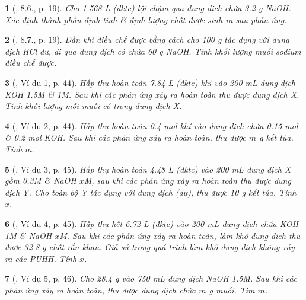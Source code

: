 \documentclass{article}
\newtheorem{baitoan}{}
\begin{document}
\begin{baitoan}[\cite{Truong_BTNC_Hoa_Hoc_9_2021}, 8.6., p. 19]
	Cho {\rm1.568 L } (đktc) lội chậm qua dung dịch chứa {\rm3.2 g NaOH}. Xác định thành phần định tính \& định lượng chất được sinh ra sau phản ứng.
\end{baitoan}

\begin{baitoan}[\cite{Truong_BTNC_Hoa_Hoc_9_2021}, 8.7., p. 19]
	Dẫn khí {\rm{}} điều chế được bằng cách cho {\rm100 g } tác dụng với dung dịch {\rm HCl} dư, đi qua dung dịch có chứa {\rm60 g NaOH}. Tính khối lượng muối sodium điều chế được.
\end{baitoan}

\begin{baitoan}[\cite{Truong_Long_Huong_bdhsg_Hoa_Hoc_9}, Ví dụ 1, p. 44]
	Hấp thụ hoàn toàn {\rm7.84 L} (đktc) khí {\rm{}} vào {\rm200 mL} dung dịch {\rm KOH 1.5M} \& {\rm{} 1M}. Sau khi các phản ứng xảy ra hoàn toàn thu được dung dịch X. Tính khối lượng mỗi muối có trong dung dịch X.
\end{baitoan}

\begin{baitoan}[\cite{Truong_Long_Huong_bdhsg_Hoa_Hoc_9}, Ví dụ 2, p. 44]
	Hấp thụ hoàn toàn {\rm0.4 mol} khí {\rm{}} vào dung dịch chứa {\rm0.15 mol } \& {\rm0.2 mol KOH}. Sau khi các phản ứng xảy ra hoàn toàn, thu được $m$ {\rm g} kết tủa. Tính $m$.
\end{baitoan}

\begin{baitoan}[\cite{Truong_Long_Huong_bdhsg_Hoa_Hoc_9}, Ví dụ 3, p. 45]
	Hấp thụ hoàn toàn {\rm4.48 L } (đktc) vào {\rm200 mL} dung dịch X gồm {\rm{} 0.3M \& NaOH $x$M}, sau khi các phản ứng xảy ra hoàn toàn thu được dung dịch Y. Cho toàn bộ Y tác dụng với dung dịch {\rm{}} (dư), thu được {\rm10 g} kết tủa. Tính $x$.
\end{baitoan}

\begin{baitoan}[\cite{Truong_Long_Huong_bdhsg_Hoa_Hoc_9}, Ví dụ 4, p. 45]
	Hấp thụ hết {\rm6.72 L } (đktc) vào {\rm200 mL} dung dịch chứa {\rm KOH 1M} \& {\rm NaOH $x$M}. Sau khi các phản ứng xảy ra hoàn toàn, làm khô dung dịch thu được {\rm32.8 g} chất rắn khan. Giả sử trong quá trình làm khô dung dịch không xảy ra các {\rm PƯHH}. Tính $x$.
\end{baitoan}

\begin{baitoan}[\cite{Truong_Long_Huong_bdhsg_Hoa_Hoc_9}, Ví dụ 5, p. 46]
	Cho {\rm28.4 g } vào {\rm750 mL} dung dịch {\rm NaOH 1.5M}. Sau khi các phản ứng xảy ra hoàn toàn, thu được dung dịch chứa $m$ {\rm g} muối. Tìm $m$.
\end{baitoan}
\end{document}
